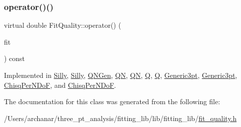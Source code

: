 \mbox{\label{classFitQuality_a49a49e1206709d71c3ead41e981bb848}} 
\subsubsection{\texorpdfstring{operator()()}{operator()()}\hspace{0.1cm}{\footnotesize\ttfamily [2/2]}}
{\footnotesize\ttfamily virtual double Fit\+Quality\+::operator() (\begin{DoxyParamCaption}\item[{const \mbox{\hyperlink{classAvgFit}{Avg\+Fit}} \&}]{fit }\end{DoxyParamCaption}) const\hspace{0.3cm}{\ttfamily [pure virtual]}}



Implemented in \mbox{\hyperlink{classSilly_a7da4b46c49f85b3dbf91bbdcd7299b2c}{Silly}}, \mbox{\hyperlink{classSilly_a7da4b46c49f85b3dbf91bbdcd7299b2c}{Silly}}, \mbox{\hyperlink{classQNGen_a318c2cf305ceb9e81bef665364686408}{Q\+N\+Gen}}, \mbox{\hyperlink{classQN_a3328fcfb7a093b9e843cd0da56bf09f3}{QN}}, \mbox{\hyperlink{classQN_a3328fcfb7a093b9e843cd0da56bf09f3}{QN}}, \mbox{\hyperlink{classQ_a783778170d5dbec7517dbe5c6f00a3c3}{Q}}, \mbox{\hyperlink{classQ_a783778170d5dbec7517dbe5c6f00a3c3}{Q}}, \mbox{\hyperlink{classGeneric3pt_ae10e73d761543be321a101ce1e57b49e}{Generic3pt}}, \mbox{\hyperlink{classGeneric3pt_ae10e73d761543be321a101ce1e57b49e}{Generic3pt}}, \mbox{\hyperlink{classChisqPerNDoF_a4d45c53a895115c4fe318d22c44228e4}{Chisq\+Per\+N\+DoF}}, and \mbox{\hyperlink{classChisqPerNDoF_a4d45c53a895115c4fe318d22c44228e4}{Chisq\+Per\+N\+DoF}}.



The documentation for this class was generated from the following file\+:\begin{DoxyCompactItemize}
\item 
/\+Users/archanar/three\+\_\+pt\+\_\+analysis/fitting\+\_\+lib/lib/fitting\+\_\+lib/\mbox{\hyperlink{lib_2fitting__lib_2fit__quality_8h}{fit\+\_\+quality.\+h}}\end{DoxyCompactItemize}
